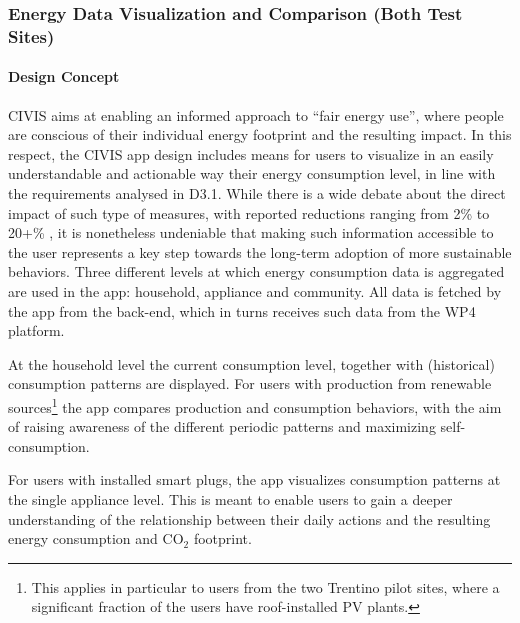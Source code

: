 \subsubsection{Energy Data Visualization and Comparison (Both Test Sites)} 
\label{sect:load_shifting}



\paragraph{Design Concept} 

CIVIS aims at enabling an informed approach to ``fair energy use'', where people are conscious of their individual energy footprint and the resulting impact. In this respect, the CIVIS app design includes means for users to visualize in an easily understandable and actionable way their energy consumption level, in line with the requirements analysed in D3.1. While there is a wide debate about the direct impact of such type of measures, with reported reductions ranging from 2\% to 20+\% \citep{eea_report}, it is nonetheless undeniable that making such information accessible to the user represents a key step towards the long-term adoption of more sustainable behaviors. 
% 
Three different levels at which energy consumption data is aggregated are used in the app: household, appliance and community. All data is fetched by the app from the back-end, which in turns receives such data from the WP4 platform. 


At the household level the current consumption level, together with (historical) consumption patterns are displayed. For users with production from renewable sources\footnote{This applies in particular to users from the two Trentino pilot sites, where a significant fraction of the users have roof-installed PV plants.} the app compares production and consumption behaviors, with the aim of raising awareness of the different periodic patterns and maximizing self-consumption. 

For users with installed smart plugs, the app visualizes consumption patterns at the single appliance level. This is meant to enable users to gain a deeper understanding of the relationship between their daily actions and the resulting energy consumption and CO$_{2}$ footprint. 

